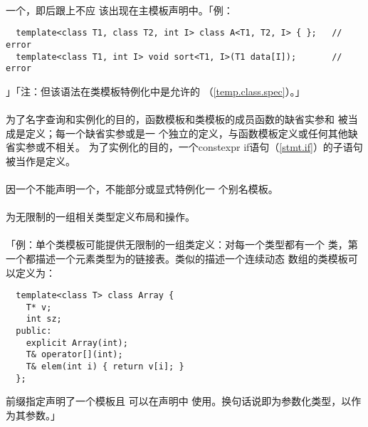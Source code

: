 \paragraph{}
一个，即后跟上不应
该出现在主模板声明中。「例：
\begin{lstlisting}
  template<class T1, class T2, int I> class A<T1, T2, I> { };   // error
  template<class T1, int I> void sort<T1, I>(T1 data[I]);       // error
\end{lstlisting}」「注：但该语法在类模板特例化中是允许的
（\ref{temp.class.spec}）。」

\paragraph{}
为了名字查询和实例化的目的，函数模板和类模板的成员函数的缺省实参和
被当成是定义；每一个缺省实参或是一
个独立的定义，与函数模板定义或任何其他缺省实参或不相关。
为了实例化的目的，一个constexpr if语句（\ref{stmt.if}）的子语句被当作是定义。

\paragraph{}
因一个不能声明一个，不能部分或显式特例化一
个别名模板。

\paragraph{}
为无限制的一组相关类型定义布局和操作。

\paragraph{}
「例：单个类模板可能提供无限制的一组类定义：对每一个类型都有一个
类，第一个都描述一个元素类型为的链接表。类似的描述一个连续动态
数组的类模板可以定义为：
\begin{lstlisting}
  template<class T> class Array {
    T* v;
    int sz;
  public:
    explicit Array(int);
    T& operator[](int);
    T& elem(int i) { return v[i]; }
  };
\end{lstlisting}
前缀指定声明了一个模板且 可以在声明中
使用。换句话说即为参数化类型，以作为其参数。」

